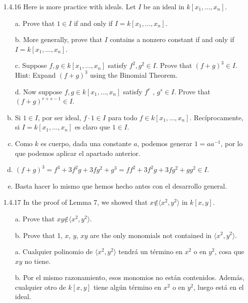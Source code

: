 \documentclass[twoside]{article}
\begin{document}
\begin{ejercicio}{1.4.16}
Here is more practice with ideals. Let $I$ be an ideal in $k[x_1,\dots , x_n]$.
\begin{enumerate}[a.]
\item[a.] Prove that $1 ∈ I$ if and only if $I = k[x_1,\dots , x_n]$.
\item[b.] More generally, prove that $I$ contains a nonzero constant if and only if $I = k[x_1,\dots, x_n]$.
\item[c.] Suppose $f , g ∈ k[x_1,\dots , x_n]$ satisfy $f^2, g^2 ∈ I$. Prove that $(f + g)^3 ∈ I$. Hint: Expand
$(f + g)^3$ using the Binomial Theorem.
\item[d.] Now suppose $f , g ∈ k[x_1,\dots , x_n]$ satisfy $f^r$ , $g^s ∈ I$. Prove that $(f + g)^{r+s−1} ∈ I$.
\end{enumerate}
\end{ejercicio}
\begin{solucion}
\begin{enumerate}[a.]
\item[]
\item Si $1\in I$, por ser ideal, $f\cdot 1\in I$ para todo $f\in k[x_1,\dots , x_n]$. Recíprocamente, si $I=k[x_1,\dotsc,x_n]$ es claro que $1\in I$.
\item Como $k$ es cuerpo, dada una constante $a$, podemos generar $1=aa^{-1}$, por lo que podemos aplicar el apartado anterior.
\item $(f+g)^3=f^3+3f^2g+3fg^2+g^3=ff^2+3f^2g+3fg^2+gg^2\in I$. 
\item Basta hacer lo mismo que hemos hecho antes con el desarrollo general. 
\end{enumerate}
\end{solucion}

\newpage

\begin{ejercicio}{1.4.17}
In the proof of Lemma 7, we showed that $x \not∈ 
\langle x^2, y^2\rangle$ in $k[x, y]$.
\begin{itemize}
\item[a.] Prove that $xy \not∈ 
\langle x^2, y^2\rangle$.
\item[b.] Prove that 1, $x$, $y$, $xy$ are the only monomials not contained in 
$\langle x^2, y^2\rangle$.
\end{itemize}
\end{ejercicio}
\begin{solucion}
\begin{itemize}
\item[]
\item[a.] Cualquier polinomio de $\langle x^2, y^2\rangle$ tendrá un término en $x^2$ o en $y^2$, cosa que $xy$ no tiene. 
\item[b.] Por el mismo razonamiento, esos monomios no están contenidos. Además, cualquier otro de $k[x,y]$ tiene algún término en $x^2$ o en $y^2$, luego está en el ideal. 
\end{itemize}
\end{solucion}
\end{document}

